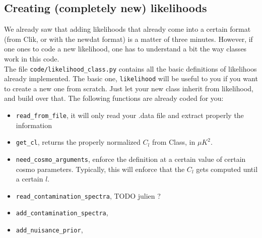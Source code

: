 \documentclass[10pt]{article}
\begin{document}
\subsection{Creating (completely new) likelihoods}

  We already saw that adding likelihoods that already come into a certain format
  (from Clik, or with the newdat format) is a matter of three minutes. However,
  if one ones to code a new likelihood, one has to understand a bit the way
  classes work in this code.\\

  The file \verb?code/likelihood_class.py? contains all the basic definitions
  of likelihoos already implemented. The basic one, \verb?likelihood? will be
  useful to you if you want to create a new one from scratch. Just let your new
  class inherit from likelihood, and build over that. The following functions are already coded for you:\\

  \begin{itemize}
    \item \verb?read_from_file?, it will only read your .data file and extract
      properly the information
    \item \verb?get_cl?, returns the properly normalized $C_l$ from Class, in $\mu K^2$.
    \item \verb?need_cosmo_arguments?, enforce the definition at a certain
      value of certain cosmo parameters. Typically, this will enforce that the
      $C_l$ gets computed until a certain $l$.
    \item \verb?read_contamination_spectra?, TODO julien ?
    \item \verb?add_contamination_spectra?,
    \item \verb?add_nuisance_prior?,
  \end{itemize}
\end{document}
